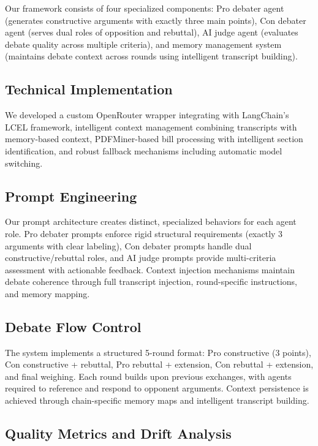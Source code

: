 \documentclass{article}
\begin{document}
Our framework consists of four specialized components: Pro debater agent (generates constructive arguments with exactly three main points), Con debater agent (serves dual roles of opposition and rebuttal), AI judge agent (evaluates debate quality across multiple criteria), and memory management system (maintains debate context across rounds using intelligent transcript building).

\subsection{Technical Implementation}

We developed a custom OpenRouter wrapper integrating with LangChain's LCEL framework, intelligent context management combining transcripts with memory-based context, PDFMiner-based bill processing with intelligent section identification, and robust fallback mechanisms including automatic model switching.

\subsection{Prompt Engineering}

Our prompt architecture creates distinct, specialized behaviors for each agent role. Pro debater prompts enforce rigid structural requirements (exactly 3 arguments with clear labeling), Con debater prompts handle dual constructive/rebuttal roles, and AI judge prompts provide multi-criteria assessment with actionable feedback. Context injection mechanisms maintain debate coherence through full transcript injection, round-specific instructions, and memory mapping.

\subsection{Debate Flow Control}

The system implements a structured 5-round format: Pro constructive (3 points), Con constructive + rebuttal, Pro rebuttal + extension, Con rebuttal + extension, and final weighing. Each round builds upon previous exchanges, with agents required to reference and respond to opponent arguments. Context persistence is achieved through chain-specific memory maps and intelligent transcript building.

\subsection{Quality Metrics and Drift Analysis}
\end{document}
